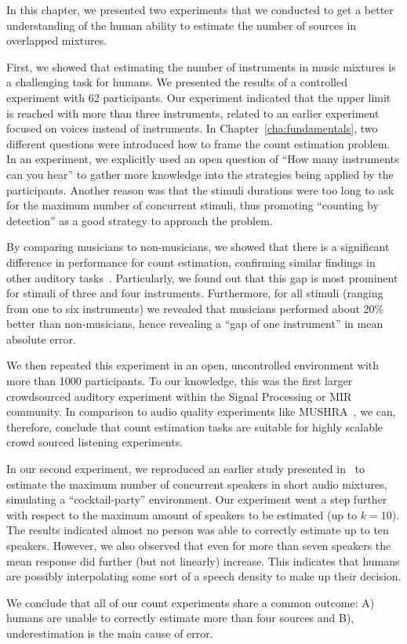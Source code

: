 In this chapter, we presented two experiments that we conducted to get a better understanding of the human ability to estimate the number of sources in overlapped mixtures.
\par
First, we showed that estimating the number of instruments in music mixtures is a challenging task for humans.
We presented the results of a controlled experiment with 62 participants.
Our experiment indicated that the upper limit is reached with more than three instruments, related to an earlier experiment~\cite{huron89} focused on voices instead of instruments.
In Chapter~\ref{cha:fundamentals}, two different questions were introduced how to frame the count estimation problem.
In an experiment, we explicitly used an open question of ``How many instruments can you hear'' to gather more knowledge into the strategies being applied by the participants.
Another reason was that the stimuli durations were too long to ask for the maximum number of concurrent stimuli, thus promoting ``counting by detection'' as a good strategy to approach the problem.\par
By comparing musicians to non-musicians, we showed that there is a significant difference in performance for count estimation, confirming similar findings in other auditory tasks~\cite{kishon01}.
Particularly, we found out that this gap is most prominent for stimuli of three and four instruments.
Furthermore, for all stimuli (ranging from one to six instruments) we revealed that musicians performed about 20\% better than non-musicians, hence revealing a ``gap of one instrument'' in mean absolute error.
\par
We then repeated this experiment in an open, uncontrolled environment with more than 1000 participants.
To our knowledge, this was the first larger crowdsourced auditory experiment within the Signal Processing or MIR community.
In comparison to audio quality experiments like MUSHRA~\cite{recommendation2001MUSHRA}, we can, therefore, conclude that count estimation tasks are suitable for highly scalable crowd sourced listening experiments.
\par
In our second experiment, we reproduced an earlier study presented in~\cite{kawashima15} to estimate the maximum number of concurrent speakers in short audio mixtures, simulating a ``cocktail-party'' environment.
Our experiment went a step further with respect to the maximum amount of speakers to be estimated (up to \(k=10\)).
The results indicated almost no person was able to correctly estimate up to ten speakers.
However, we also observed that even for more than seven speakers the mean response did further (but not linearly) increase.
This indicates that humans are possibly interpolating some sort of a speech density to make up their decision.
\par
We conclude that all of our count experiments share a common outcome: A) humans are unable to correctly estimate more than four sources and B), underestimation is the main cause of error.
